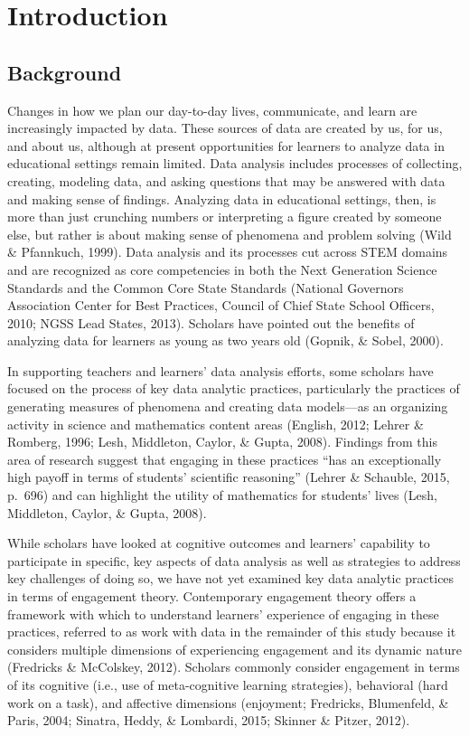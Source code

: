 \documentclass[]{msu-thesis}
\theoremstyle{definition}
\theoremstyle{definition}
\theoremstyle{definition}
\theoremstyle{remark}
\begin{document}
\chapter{Introduction}\label{intro}

\section{Background}\label{background}

\DoubleSpacing

Changes in how we plan our day-to-day lives, communicate, and learn are
increasingly impacted by data. These sources of data are created by us,
for us, and about us, although at present opportunities for learners to
analyze data in educational settings remain limited. Data analysis
includes processes of collecting, creating, modeling data, and asking
questions that may be answered with data and making sense of findings.
Analyzing data in educational settings, then, is more than just
crunching numbers or interpreting a figure created by someone else, but
rather is about making sense of phenomena and problem solving (Wild \&
Pfannkuch, 1999). Data analysis and its processes cut across STEM
domains and are recognized as core competencies in both the Next
Generation Science Standards and the Common Core State Standards
(National Governors Association Center for Best Practices, Council of
Chief State School Officers, 2010; NGSS Lead States, 2013). Scholars
have pointed out the benefits of analyzing data for learners as young as
two years old (Gopnik, \& Sobel, 2000).

In supporting teachers and learners' data analysis efforts, some
scholars have focused on the process of key data analytic practices,
particularly the practices of generating measures of phenomena and
creating data models---as an organizing activity in science and
mathematics content areas (English, 2012; Lehrer \& Romberg, 1996; Lesh,
Middleton, Caylor, \& Gupta, 2008). Findings from this area of research
suggest that engaging in these practices ``has an exceptionally high
payoff in terms of students' scientific reasoning'' (Lehrer \& Schauble,
2015, p.~696) and can highlight the utility of mathematics for students'
lives (Lesh, Middleton, Caylor, \& Gupta, 2008).

While scholars have looked at cognitive outcomes and learners'
capability to participate in specific, key aspects of data analysis as
well as strategies to address key challenges of doing so, we have not
yet examined key data analytic practices in terms of engagement theory.
Contemporary engagement theory offers a framework with which to
understand learners' experience of engaging in these practices, referred
to as work with data in the remainder of this study because it considers
multiple dimensions of experiencing engagement and its dynamic nature
(Fredricks \& McColskey, 2012). Scholars commonly consider engagement in
terms of its cognitive (i.e., use of meta-cognitive learning
strategies), behavioral (hard work on a task), and affective dimensions
(enjoyment; Fredricks, Blumenfeld, \& Paris, 2004; Sinatra, Heddy, \&
Lombardi, 2015; Skinner \& Pitzer, 2012).
\end{document}
